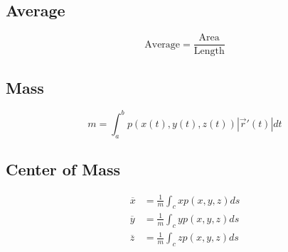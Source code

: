   \subsection{Average}

    \begin{equation}
      \text{Average} = \frac{\text{Area}}{\text{Length}}
    \end{equation}

  \subsection{Mass}

    \begin{equation}
      m = \int_{a}^{b} p
      \left(
        x\left( t \right),
        y\left( t \right),
        z\left( t \right)
      \right) \left| \vec{r}'(t) \right| dt
    \end{equation}

  \subsection{Center of Mass}

    \begin{align}
      \overline{x} &= \frac{1}{m} \int_{c} x p\left( x, y, z \right) ds \\
      \overline{y} &= \frac{1}{m} \int_{c} y p\left( x, y, z \right) ds \\
      \overline{z} &= \frac{1}{m} \int_{c} z p\left( x, y, z \right) ds
    \end{align}
